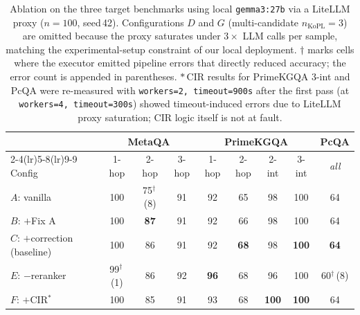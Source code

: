%
%
\begin{table}[t]
\centering
\small
\caption{Ablation on the three target benchmarks using local \texttt{gemma3:27b} via a LiteLLM proxy ($n=100$, seed\,42). Configurations $D$ and $G$ (multi-candidate $n_{\text{KoPL}}{=}3$) are omitted because the proxy saturates under $3\times$ LLM calls per sample, matching the experimental-setup constraint of our local deployment. $\dagger$ marks cells where the executor emitted pipeline errors that directly reduced accuracy; the error count is appended in parentheses. $*$\,CIR results for PrimeKGQA 3-int and PcQA were re-measured with \texttt{workers=2, timeout=900s} after the first pass (at \texttt{workers=4, timeout=300s}) showed timeout-induced errors due to LiteLLM proxy saturation; CIR logic itself is not at fault.}
\label{tab:ablation_gemma3}
\begin{tabular}{l ccc cccc c}
\toprule
 & \multicolumn{3}{c}{\textbf{MetaQA}} & \multicolumn{4}{c}{\textbf{PrimeKGQA}} & \textbf{PcQA} \\
\cmidrule(lr){2-4}\cmidrule(lr){5-8}\cmidrule(lr){9-9}
Config & 1-hop & 2-hop & 3-hop & 1-hop & 2-hop & 2-int & 3-int & \textit{all} \\
\midrule
$A$: vanilla                 & 100 & 75$^\dagger$\,(8) & 91  & 92 & 65 & 98 & 100 & 64 \\
$B$: $+$Fix A                & 100 & \textbf{87}       & 91  & 92 & 66 & 98 & 100 & 64 \\
$C$: $+$correction (baseline) & 100 & 86                & 91  & 92 & \textbf{68} & 98 & \textbf{100} & \textbf{64} \\
\midrule
$E$: $-$reranker             & 99$^\dagger$\,(1) & 86    & 92  & \textbf{96} & 68 & 96 & 100 & 60$^\dagger$\,(8) \\
$F$: $+$CIR$^*$              & 100 & 85                & 91  & 93 & 68 & \textbf{100} & \textbf{100} & 64 \\
\bottomrule
\end{tabular}
\end{table}
